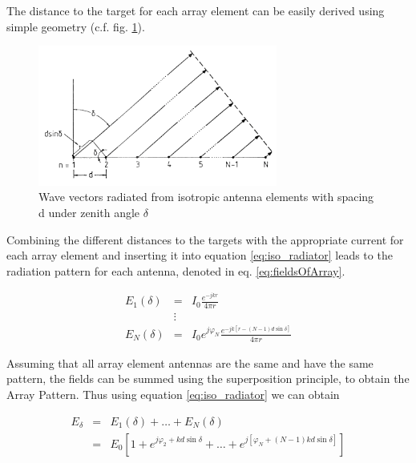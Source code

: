 The distance to the target for each array element can be easily derived using simple geometry (c.f. fig. \ref{fig:radiationPattern}).

\begin{figure}[!h]
\centering
	\includegraphics[width=0.7\textwidth]{images/PAradiationPattern}
	\caption{Wave vectors radiated from isotropic antenna elements with spacing d under zenith angle $\delta$ \citep[c.f.][Figure 10]{roettger1989instrumental}}
	\label{fig:radiationPattern}
\end{figure}

Combining the different distances to the targets with the appropriate current for each array element and inserting it into equation \ref{eq:iso_radiator} leads to the radiation pattern for each antenna, denoted in eq. \ref{eq:fieldsOfArray}. 

\begin{eqnarray}
	E_1(\delta) &=& I_0 \frac{e^{-jkr}}{4\pi r}\\
        &\vdots& \nonumber \\
	E_N(\delta) &=& I_0 e^{j\varphi_{N}} \frac{e^{-jk[r - (N-1)d\sin\delta]}}{4\pi r}
	\label{eq:fieldsOfArray}
\end{eqnarray}

Assuming that all array element antennas are the same and have the same pattern, the fields can be summed using the superposition principle, to obtain the Array Pattern. Thus using equation \ref{eq:iso_radiator} we can obtain


\begin{eqnarray}
	E_\delta &=& E_1(\delta) + \dots + E_N(\delta) \\
	 &=& E_0 [1 + e^{j\varphi_2 + k d \sin \delta} + \dots + e^{j[\varphi_N + (N-1) k d \sin \delta]}]
\end{eqnarray}

